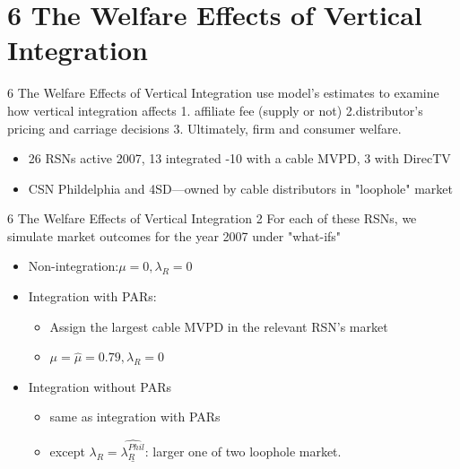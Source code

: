 \documentclass[10pt]{beamer}
\begin{document}
\section{6 The Welfare Effects of Vertical Integration}
\begin{frame}{6 The Welfare Effects of Vertical Integration}
    use model's estimates to examine how vertical integration affects 1. affiliate fee (supply or not) 2.distributor's pricing and carriage decisions 3. Ultimately, firm and consumer welfare. 
    \begin{itemize}
        \item 26 RSNs active 2007, 13 integrated -10 with a cable MVPD, 3 with DirecTV
        \item CSN Phildelphia and 4SD---owned by cable distributors in "loophole" market
    \end{itemize}
\end{frame}
\begin{frame}{6 The Welfare Effects of Vertical Integration 2}
    For each of these RSNs, we simulate market outcomes for the year 2007 under "what-ifs"
    \begin{itemize}
        \item Non-integration:$\mu=0,\lambda_R=0$
        \item Integration with PARs: 
        \begin{itemize}
            \item Assign the largest cable MVPD in the relevant RSN's market
            \item $\mu=\hat{\mu}=0.79, \lambda_R=0$
        \end{itemize}
        \item Integration without PARs
        \begin{itemize}
            \item same as integration with PARs
            \item except $\lambda_R=\hat{\underline{\lambda_{R}^{Phil}}}$: larger one of two loophole market.
        \end{itemize}
    \end{itemize}
\end{frame}
\end{document}
